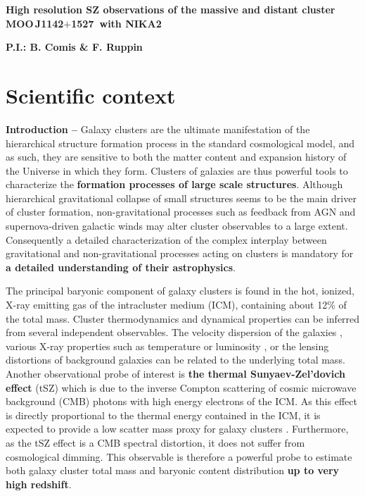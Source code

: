 \documentclass[11pt,a4paper,twoside,graphicx,color]{article}
\begin{document}
\def\moo{MOO\,J1142$+$1527}
%
%
\begin{center}{\huge \bf
High resolution SZ observations of the massive and distant cluster \moo\ with NIKA2
}\end{center}
% 
\centerline{\bf P.I.: B. Comis \& F. Ruppin}

\section{Scientific context}
{\bf \large Introduction -- } 
Galaxy clusters are the ultimate manifestation of the hierarchical structure formation process in the standard cosmological model, and as such, they are sensitive to both the matter content and expansion history of the Universe in which they form. Clusters of galaxies are thus powerful tools to characterize the \textbf{formation processes of large scale structures}. Although hierarchical gravitational collapse of small structures seems to be the main driver of cluster formation, non-gravitational processes such as feedback from AGN and supernova-driven galactic winds may alter cluster observables to a large extent. Consequently a detailed characterization of the complex interplay between gravitational and non-gravitational processes acting on clusters is mandatory for \textbf{a detailed understanding of their astrophysics}.

The principal baryonic component of galaxy clusters is found in the hot, ionized, X-ray emitting gas of the intracluster medium (ICM), containing about 12\% of the total mass. Cluster thermodynamics and dynamical properties can be inferred from several independent observables. The velocity dispersion of the galaxies \cite{sif16}, various X-ray properties such as temperature or luminosity \cite{pra09}, or the lensing distortions of background galaxies \cite{hoe15} can be related to the underlying total mass. Another observational probe of interest is \textbf{the thermal Sunyaev-Zel'dovich effect} (tSZ) \cite{sun72} which is due to the inverse Compton scattering of cosmic microwave background (CMB) photons with high energy electrons of the ICM. As this effect is directly proportional to the thermal energy contained in the ICM, it is expected to provide a low scatter mass proxy for galaxy clusters \cite{nag07}. Furthermore, as the tSZ effect is a CMB spectral distortion, it does not suffer from cosmological dimming. This observable is therefore a powerful probe to estimate both galaxy cluster total mass and baryonic content distribution \textbf{up to very high redshift}.
\end{document}
